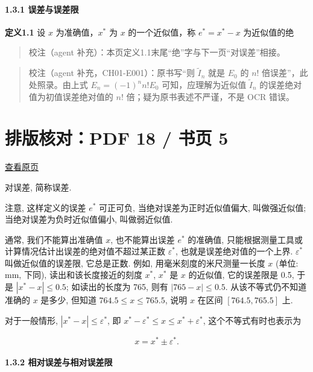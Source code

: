 \documentclass[
  10pt,
  a4paper,
]{article}
\begin{document}
\paragraph{1.3.1
误差与误差限}\label{ux8befux5deeux4e0eux8befux5deeux9650}

\textbf{定义1.1} 设 \(x\) 为准确值，\(x^*\) 为 \(x\) 的一个近似值，称
\(e^* = x^* - x\) 为近似值的绝

\begin{quote}
校注（agent 补充）：本页定义1.1末尾``绝''字与下一页``对误差''相接。
\end{quote}

\begin{quote}
校注（agent 补充，CH01-E001）：原书写``则 \(\tilde{I}_n\) 就是 \(E_0\)
的 \(n!\) 倍误差''，此处照录。由上式 \(E_n=(-1)^n n!E_0\)
可知，应理解为近似值 \(\tilde{I}_n\) 的误差绝对值为初值误差绝对值的
\(n!\) 倍；疑为原书表述不严谨，不是 OCR 错误。
\end{quote}

\newpage

\section{排版核对：PDF 18 / 书页
5}\label{ux6392ux7248ux6838ux5bf9pdf-18-ux4e66ux9875-5}

\href{../../../source-images/pdf-018.jpeg}{查看原页}

对误差, 简称误差.

注意, 这样定义的误差 \(e^*\) 可正可负, 当绝对误差为正时近似值偏大,
叫做强近似值; 当绝对误差为负时近似值偏小, 叫做弱近似值.

通常, 我们不能算出准确值 \(x\), 也不能算出误差 \(e^*\) 的准确值,
只能根据测量工具或计算情况估计出误差的绝对值不超过某正数
\(\varepsilon^*\), 也就是误差绝对值的一个上界. \(\varepsilon^*\)
叫做近似值的误差限, 它总是正数. 例如, 用毫米刻度的米尺测量一长度 \(x\)
(单位: mm, 下同), 读出和该长度接近的刻度 \(x^*\), \(x^*\) 是 \(x\)
的近似值, 它的误差限是 0.5, 于是 \(|x^* - x| \leqslant 0.5\);
如读出的长度为 765, 则有 \(|765 - x| \leqslant 0.5\).
从该不等式仍不知道准确的 \(x\) 是多少, 但知道
\(764.5 \leqslant x \leqslant 765.5\), 说明 \(x\) 在区间
\([764.5, 765.5]\) 上.

对于一般情形, \(|x^* - x| \leqslant \varepsilon^*\), 即
\(x^* - \varepsilon^* \leqslant x \leqslant x^* + \varepsilon^*\),
这个不等式有时也表示为

\[
x = x^* \pm \varepsilon^*.
\]

\paragraph{1.3.2
相对误差与相对误差限}\label{ux76f8ux5bf9ux8befux5deeux4e0eux76f8ux5bf9ux8befux5deeux9650}
\end{document}
